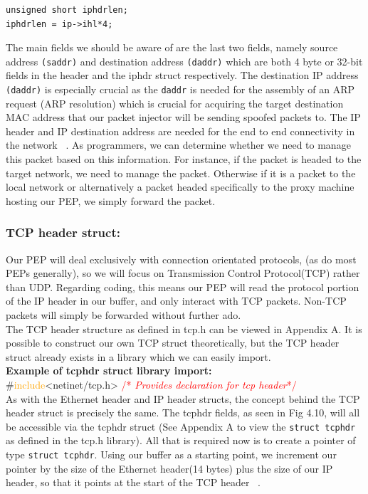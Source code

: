 \begin{lstlisting}
unsigned short iphdrlen;
iphdrlen = ip->ihl*4;
\end{lstlisting}

The main fields we should be aware of are the last two fields, namely source address {\tt (saddr)} and destination address {\tt (daddr)} which are both 4 byte or 32-bit fields in the header and the iphdr struct respectively. The destination IP address {\tt (daddr)} is especially crucial as the {\tt daddr} is needed for the assembly of an ARP request (ARP resolution) which is crucial for acquiring the target destination MAC address that our packet injector will be sending spoofed packets to. The IP header and IP destination address are needed for the end to end connectivity in the network ~\cite{1}. As programmers, we can determine whether we need to manage this packet based on this information. For instance, if the packet is headed to the target network, we need to manage the packet. Otherwise if it is a packet to the local network or alternatively a packet headed specifically to the proxy machine hosting our PEP, we simply forward the packet.  \\

\subsubsection*{TCP header struct:}

Our PEP will deal exclusively with connection orientated protocols, (as do most PEPs generally), so we will focus on Transmission Control Protocol(TCP) rather than UDP. Regarding coding, this means our PEP will read the protocol portion of the IP header in our buffer, and only interact with TCP packets. Non-TCP packets will simply be forwarded without further ado.\\

The TCP header structure as defined in tcp.h can be viewed in Appendix A. It is possible to construct our own TCP struct theoretically, but the TCP header struct already exists in a library which we can easily import. \\

\noindent\textbf{Example of tcphdr struct library import:}\\
{\#}\textcolor{orange}{include}<netinet/tcp.h> \textcolor{red}{{\//*} \emph{Provides declaration for tcp header}{\/*/}} \\

As with the Ethernet header and IP header structs, the concept behind the TCP header struct is precisely the same. The tcphdr fields, as seen in Fig 4.10, will all be accessible via the tcphdr struct (See Appendix A to view the {\tt struct tcphdr} as defined in the tcp.h library). All that is required now is to create a pointer of type {\tt struct tcphdr}. Using our buffer as a starting point, we increment our pointer by the size of the Ethernet header(14 bytes) plus the size of our IP header, so that it points at the start of the TCP header ~\cite{38}.\\

